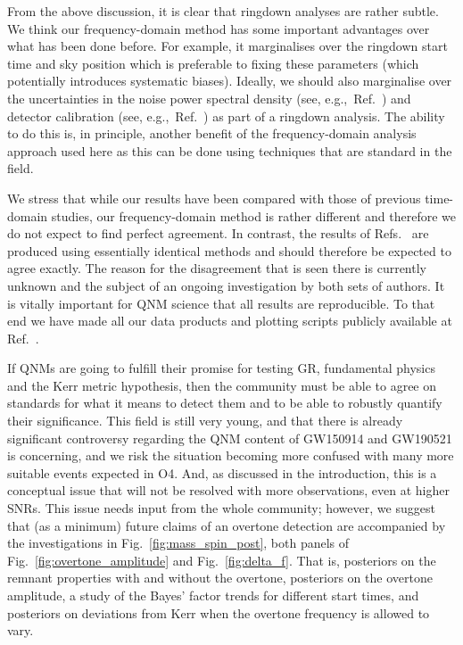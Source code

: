 From the above discussion, it is clear that ringdown analyses are rather subtle. 
We think our frequency-domain method has some important advantages over what has been done before. 
For example, it marginalises over the ringdown start time and sky position which is preferable to fixing these parameters (which potentially introduces systematic biases). 
Ideally, we should also marginalise over the uncertainties in the noise power spectral density (see, e.g.,\ Ref.~\cite{Cornish:2020dwh}) and detector calibration (see, e.g.,\ Ref.~\cite{LIGOScientific:2017aaj}) as part of a ringdown analysis. 
The ability to do this is, in principle, another benefit of the frequency-domain analysis approach used here as this can be done using techniques that are standard in the field.

We stress that while our results have been compared with those of previous time-domain studies, our frequency-domain method is rather different and therefore we do not expect to find perfect agreement. 
In contrast, the results of Refs.~\cite{Isi:2019aib, Cotesta:2022pci, Isi:2022mhy} are produced using essentially identical methods and should therefore be expected to agree exactly. 
The reason for the disagreement that is seen there is currently unknown and the subject of an ongoing investigation by both sets of authors.
It is vitally important for QNM science that all results are reproducible. To that end we have made all our data products and plotting scripts publicly available at Ref.~\cite{finch_eliot_2022_6949492}.

If QNMs are going to fulfill their promise for testing GR, fundamental physics and the Kerr metric hypothesis, then the community must be able to agree on standards for what it means to detect them and to be able to robustly quantify their significance. 
This field is still very young, and that there is already significant controversy regarding the QNM content of GW150914 and GW190521 is concerning, and we risk the situation becoming more confused with many more suitable events expected in O4.
And, as discussed in the introduction, this is a conceptual issue that will not be resolved with more observations, even at higher SNRs.
This issue needs input from the whole community; however, we suggest that (as a minimum) future claims of an overtone detection are accompanied by the investigations in Fig.~\ref{fig:mass_spin_post}, both panels of Fig.~\ref{fig:overtone_amplitude} and Fig.~\ref{fig:delta_f}.
That is, posteriors on the remnant properties with and without the overtone, posteriors on the overtone amplitude, a study of the Bayes' factor trends for different start times, and posteriors on deviations from Kerr when the overtone frequency is allowed to vary.